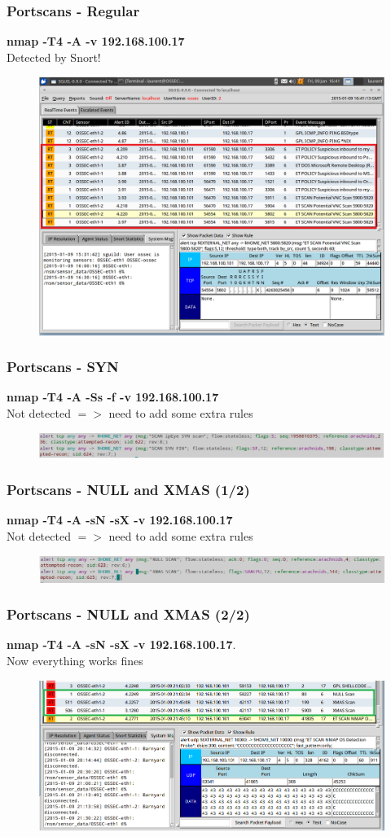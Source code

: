 \documentclass{beamer}
\begin{document}
\begin{frame}
\frametitle{Portscans - Regular}
\textbf{nmap -T4 -A -v 192.168.100.17}\\
Detected by Snort!
\begin{figure}
   \includegraphics[width= 0.7\linewidth]{../images/VM_portscan_2.png}
\end{figure}
\end{frame}
\begin{frame}
\frametitle{Portscans - SYN}
\textbf{nmap -T4 -A -Ss -f -v 192.168.100.17}\\
Not detected $=>$ need to add some extra rules
\begin{figure}
   \includegraphics[width= 1\linewidth]{../images/VM_SynNULL_3.png}
\end{figure}
\end{frame}
\begin{frame}
\frametitle{Portscans - NULL and XMAS (1/2)}
\textbf{nmap -T4 -A -sN -sX -v 192.168.100.17} \\
Not detected $=>$ need to add some extra rules
\begin{figure}
   \includegraphics[width= 1\linewidth]{../images/VM_XMAS_2.png}
\end{figure}
\end{frame}
\begin{frame}
\frametitle{Portscans - NULL and XMAS (2/2)}
\textbf{nmap -T4 -A -sN -sX -v 192.168.100.17}. \\
Now everything works fines
\begin{figure}
   \includegraphics[width= 1\linewidth]{../images/VM_XMAS.png}
\end{figure}
\end{frame}
\end{document}
